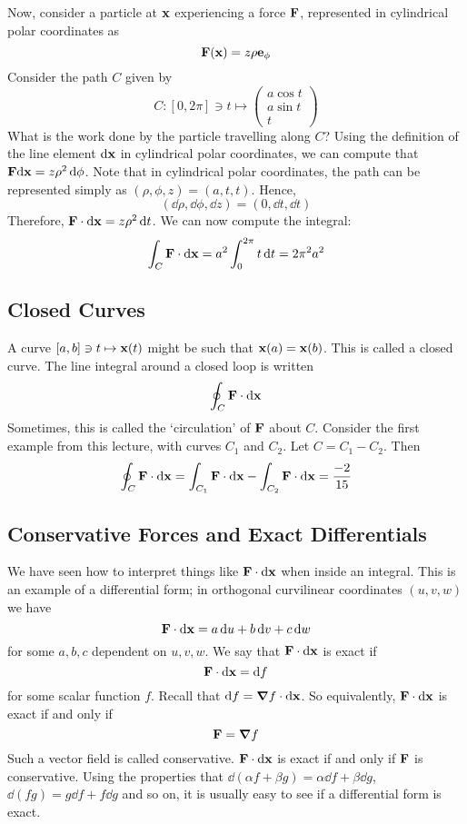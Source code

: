 Now, consider a particle at \(\vb x\) experiencing a force \(\vb F\), represented in cylindrical polar coordinates as
\[
	\vb F(\vb x) = z\rho \vb e_{\phi}
\]
Consider the path \(C\) given by
\[
	C \colon [0, 2\pi] \ni t \mapsto \begin{pmatrix}
		a \cos t \\ a \sin t \\ t
	\end{pmatrix}
\]
What is the work done by the particle travelling along \(C\)?
Using the definition of the line element \(\dd \vb x\) in cylindrical polar coordinates, we can compute that \(\vb F \dd \vb x = z \rho^2 \dd{\phi}\).
Note that in cylindrical polar coordinates, the path can be represented simply as \((\rho, \phi, z) = (a, t, t)\).
Hence,
\[
	(\dd{\rho}, \dd{\phi}, \dd{z}) = (0, \dd{t}, \dd{t})
\]
Therefore, \(\vb F \cdot \dd \vb x = z \rho^2 \dd{t}\).
We can now compute the integral:
\[
	\int_C \vb F \cdot \dd \vb x = a^2 \int_0^{2\pi} t\dd{t} = 2\pi^2a^2
\]

\subsection{Closed Curves}
A curve \([a, b] \ni t \mapsto \vb x(t)\) might be such that \(\vb x(a) = \vb x(b)\).
This is called a closed curve.
The line integral around a closed loop is written
\[
	\oint_C \vb F \cdot \dd \vb x
\]
Sometimes, this is called the `circulation' of \(\vb F\) about \(C\).
Consider the first example from this lecture, with curves \(C_1\) and \(C_2\).
Let \(C = C_1 - C_2\).
Then
\[
	\oint_C \vb F \cdot \dd \vb x = \int_{C_1} \vb F \cdot \dd \vb x - \int_{C_2} \vb F \cdot \dd \vb x = \frac{-2}{15}
\]

\subsection{Conservative Forces and Exact Differentials}
We have seen how to interpret things like \(\vb F \cdot \dd \vb x\) when inside an integral.
This is an example of a differential form; in orthogonal curvilinear coordinates \((u, v, w)\) we have
\[
	\vb F \cdot \dd \vb x = a \dd{u} + b \dd{v} + c \dd{w}
\]
for some \(a, b, c\) dependent on \(u, v, w\).
We say that \(\vb F \cdot \dd \vb x\) is exact if
\[
	\vb F \cdot \dd \vb x = \dd{f}
\]
for some scalar function \(f\).
Recall that \(\dd{f} = \grad f \cdot \dd \vb x\).
So equivalently, \(\vb F \cdot \dd \vb x\) is exact if and only if
\[
	\vb F = \grad f
\]
Such a vector field is called conservative.
\(\vb F \cdot \dd \vb x\) is exact if and only if \(\vb F\) is conservative.
Using the properties that \(\dd (\alpha f + \beta g) = \alpha \dd{f} + \beta \dd{g}\), \(\dd (fg) = g \dd{f} + f \dd{g}\) and so on, it is usually easy to see if a differential form is exact.

